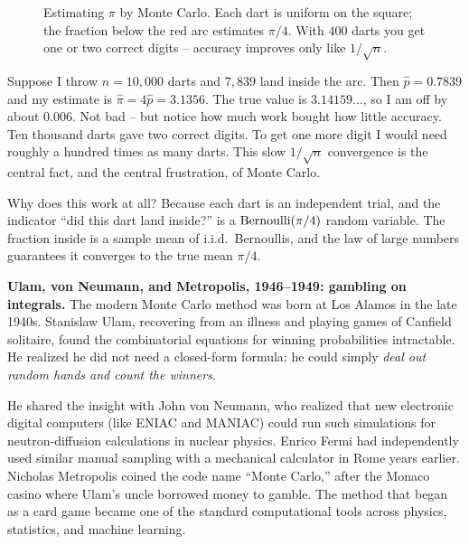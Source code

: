 \begin{figure}[H]
\centering
{}
\caption{Estimating $\pi$ by Monte Carlo. Each dart is uniform on the square;
the fraction below the red arc estimates $\pi/4$. With $400$ darts you get one
or two correct digits -- accuracy improves only like $1/\sqrt{n}$.}
\label{ch35:fig-pi-darts}
\end{figure}
\begin{example}[Estimating $\pi$]
\label{ch35:ex-pi}
Suppose I throw $n = 10{,}000$ darts and $7{,}839$ land inside the arc. Then
$\hat p = 0.7839$ and my estimate is $\hat\pi = 4\hat p = 3.1356$. The true value
is $3.14159\dots$, so I am off by about $0.006$. Not bad -- but notice how much
work bought how little accuracy. Ten thousand darts gave two correct digits. To
get one more digit I would need roughly a hundred times as many darts. This slow
$1/\sqrt n$ convergence is the central fact, and the central frustration, of
Monte Carlo.
\end{example}
Why does this work at all? Because each dart is an independent trial, and the
indicator ``did this dart land inside?'' is a $\operatorname{Bernoulli}(\pi/4)$ random variable. The
fraction inside is a sample mean of i.i.d.\ Bernoullis, and the law of large
numbers guarantees it converges to the true mean $\pi/4$.
\begin{historybox}
\textbf{Ulam, von Neumann, and Metropolis, 1946--1949: gambling on integrals.}
The modern Monte Carlo method was born at Los Alamos in the late 1940s. Stanislaw Ulam, recovering from an illness and playing games of Canfield solitaire, found the combinatorial equations for winning probabilities intractable. He realized he did not need a closed-form formula: he could simply \emph{deal out random hands and count the winners}.

He shared the insight with John von Neumann, who realized that new electronic digital computers (like ENIAC and MANIAC) could run such simulations for neutron-diffusion calculations in nuclear physics. Enrico Fermi had independently used similar manual sampling with a mechanical calculator in Rome years earlier. Nicholas Metropolis coined the code name ``Monte Carlo,'' after the Monaco casino where Ulam's uncle borrowed money to gamble. The method that began as a card game became one of the standard computational tools across physics, statistics, and machine learning.
\end{historybox}
